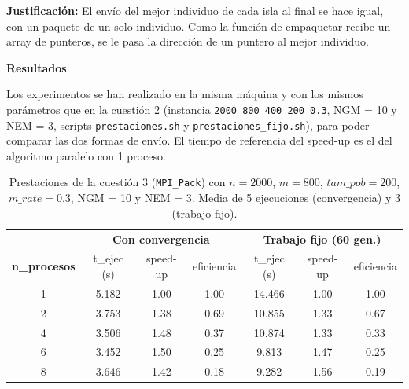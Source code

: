 \documentclass[12pt]{article}
\begin{document}
\begin{enumerate}
\textbf{Justificación:} El envío del mejor individuo de cada isla al final se hace igual, con un paquete de un solo individuo. Como la función de empaquetar recibe un array de punteros, se le pasa la dirección de un puntero al mejor individuo.

\vspace{0.5cm}

\medskip
\noindent\textbf{Resultados}\par
\smallskip

Los experimentos se han realizado en la misma máquina y con los mismos parámetros que en la cuestión 2 (instancia \texttt{2000 800 400 200 0.3}, NGM = 10 y NEM = 3, scripts \texttt{prestaciones.sh} y \texttt{prestaciones\_fijo.sh}), para poder comparar las dos formas de envío. El tiempo de referencia del speed-up es el del algoritmo paralelo con 1 proceso.

\begin{table}[htbp]
\centering
\begin{tabular}{c|ccc|ccc}
\toprule
& \multicolumn{3}{c|}{\textbf{Con convergencia}} & \multicolumn{3}{c}{\textbf{Trabajo fijo (60 gen.)}} \\
\textbf{n\_procesos} & t\_ejec (s) & speed-up & eficiencia & t\_ejec (s) & speed-up & eficiencia \\
\midrule
1 & 5.182 & 1.00 & 1.00 & 14.466 & 1.00 & 1.00 \\
2 & 3.753 & 1.38 & 0.69 & 10.855 & 1.33 & 0.67 \\
4 & 3.506 & 1.48 & 0.37 & 10.874 & 1.33 & 0.33 \\
6 & 3.452 & 1.50 & 0.25 & 9.813 & 1.47 & 0.25 \\
8 & 3.646 & 1.42 & 0.18 & 9.282 & 1.56 & 0.19 \\
\bottomrule
\end{tabular}
\caption{Prestaciones de la cuestión 3 (\texttt{MPI\_Pack}) con $n=2000$, $m=800$, $tam\_pob=200$, $m\_rate=0.3$, NGM = 10 y NEM = 3. Media de 5 ejecuciones (convergencia) y 3 (trabajo fijo).}
\label{tab:c3_prestaciones}
\end{table}


\end{enumerate}
\end{document}
